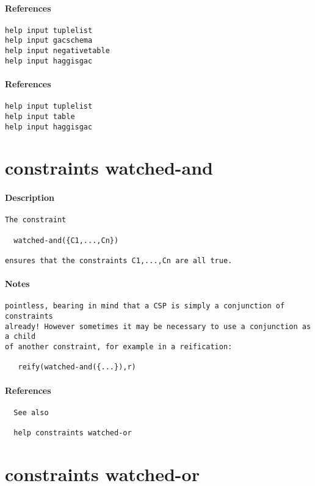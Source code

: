 \paragraph{References}
{\footnotesize
\begin{verbatim}
help input tuplelist
help input gacschema
help input negativetable
help input haggisgac
\end{verbatim}
}
\paragraph{References}
{\footnotesize
\begin{verbatim}
help input tuplelist
help input table
help input haggisgac
\end{verbatim}
}
\section{constraints watched-and}
\paragraph{Description}
{\footnotesize
\begin{verbatim}
The constraint

  watched-and({C1,...,Cn})

ensures that the constraints C1,...,Cn are all true.
\end{verbatim}
}
\paragraph{Notes}
{\footnotesize
\begin{verbatim}
pointless, bearing in mind that a CSP is simply a conjunction of constraints
already! However sometimes it may be necessary to use a conjunction as a child
of another constraint, for example in a reification:

   reify(watched-and({...}),r)
\end{verbatim}
}
\paragraph{References}
{\footnotesize
\begin{verbatim}
  See also

  help constraints watched-or
\end{verbatim}
}
\section{constraints watched-or}
